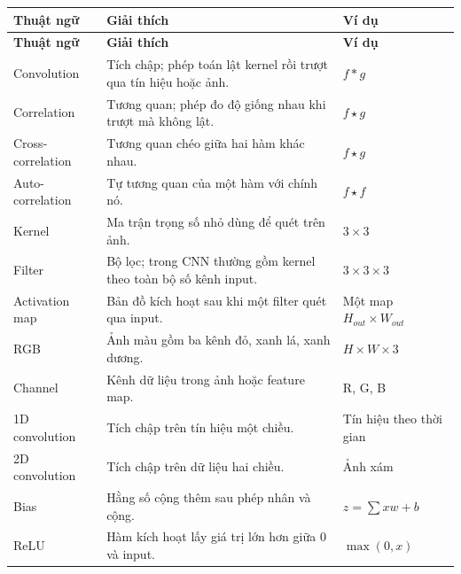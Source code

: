 \small
\begin{longtable}{p{}p{}p{}}
\toprule
\textbf{Thuật ngữ} & \textbf{Giải thích} & \textbf{Ví dụ} \\
\midrule
\endfirsthead

\toprule
\textbf{Thuật ngữ} & \textbf{Giải thích} & \textbf{Ví dụ} \\
\midrule
\endhead

Convolution & Tích chập; phép toán lật kernel rồi trượt qua tín hiệu hoặc ảnh. & $f*g$ \\

Correlation & Tương quan; phép đo độ giống nhau khi trượt mà không lật. & $f \star g$ \\

Cross-correlation & Tương quan chéo giữa hai hàm khác nhau. & $f \star g$ \\

Auto-correlation & Tự tương quan của một hàm với chính nó. & $f \star f$ \\

Kernel & Ma trận trọng số nhỏ dùng để quét trên ảnh. & $3\times3$ \\

Filter & Bộ lọc; trong CNN thường gồm kernel theo toàn bộ số kênh input. & $3\times3\times3$ \\

Activation map & Bản đồ kích hoạt sau khi một filter quét qua input. & Một map $H_{out}\times W_{out}$ \\

RGB & Ảnh màu gồm ba kênh đỏ, xanh lá, xanh dương. & $H\times W\times3$ \\

Channel & Kênh dữ liệu trong ảnh hoặc feature map. & R, G, B \\

1D convolution & Tích chập trên tín hiệu một chiều. & Tín hiệu theo thời gian \\

2D convolution & Tích chập trên dữ liệu hai chiều. & Ảnh xám \\

Bias & Hằng số cộng thêm sau phép nhân và cộng. & $z=\sum xw+b$ \\

ReLU & Hàm kích hoạt lấy giá trị lớn hơn giữa 0 và input. & $\max(0,x)$ \\

\bottomrule
\end{longtable}
\normalsize

